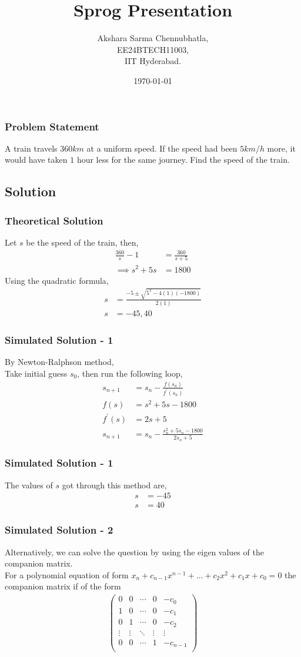 \documentclass{beamer}
\title{Sprog Presentation}
\author{Akshara Sarma Chennubhatla,\\ EE24BTECH11003,\\IIT Hyderabad.\\}
\date{\today}
\providecommand{\brak}[1]{\ensuremath{\left(#1\right)}}
\theoremstyle{remark}
\newcommand{\myvec}[1]{\ensuremath{\begin{pmatrix}#1\end{pmatrix}}}
\numberwithin{equation}{section}
\begin{document}
		\begin{frame}
			\titlepage
		\end{frame}

		\begin{frame}
			\frametitle{Problem Statement}
A train travels $360km$ at a uniform speed. If the speed had been $5km/h$ more, it would have taken $1$ hour less for the same journey. Find the speed of the train.
		\end{frame}
		\subsection{Solution}
		\begin{frame}
      \frametitle{Theoretical Solution}
		Let $s$ be the speed of the train, then,
\begin{align}
	\frac{360}{s} - 1 &= \frac{360}{s + 5}\\
	\implies s^2 + 5s &= 1800
\end{align}
Using the quadratic formula,
\begin{align}
	s &= \frac{-5 \pm \sqrt{5^2 - 4\brak{1}\brak{-1800}}}{2\brak{1}}\\
	s &= -45, 40
\end{align}
\end{frame}
\begin{frame}
      \frametitle{Simulated Solution - 1}
	By Newton-Ralphson method,\\
Take initial guess $s_0$, then run the following loop,
\begin{align}
	s_{n+1} &= s_n - \frac{f\brak{s_n}}{f^\prime\brak{s_n}}\\
	f\brak{s} &= s^2 + 5s - 1800\\
	f^\prime\brak{s} &= 2s + 5\\
	s_{n+1} &= s_n - \frac{s_n^2 + 5s_n - 1800}{2s_n + 5}
\end{align}
\end{frame}
		\begin{frame}
      \frametitle{Simulated Solution - 1}
The values of $s$ got through this method are,
\begin{align}
	s &= -45\\
	s &= 40
\end{align}
\end{frame}
\begin{frame}
      \frametitle{Simulated Solution - 2}
			Alternatively, we can solve the question by using the eigen values of the companion matrix.\\
For a polynomial equation of form $x_n+c_{n-1}x^{n-1}+\dots+c_2x^2+c_1x+c_0 = 0$ the companion matrix if of the form
\begin{align}
	\myvec{
		0 & 0 & \cdots & 0 & -c_0\\
		1 & 0 & \cdots & 0 & -c_1\\
		0 & 1 & \cdots & 0 & -c_2\\
		\vdots & \vdots & \ddots & \vdots & \vdots\\
		0 & 0 & \cdots & 1 & -c_{n-1}\\
	}
\end{align}
\end{frame}
\end{document}

